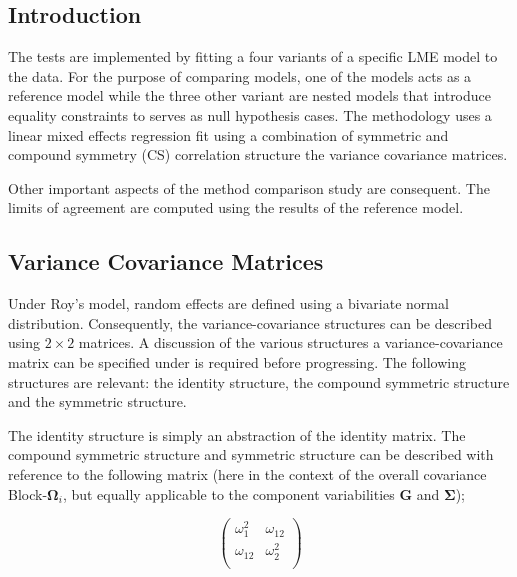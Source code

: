 \documentclass[12pt, a4paper]{report}
\theoremstyle{plain}
\theoremstyle{definition}
\theoremstyle{remark}
\begin{document}
		\subsection{Introduction}
	The tests are implemented by fitting a four variants of a specific LME model to the data. For the purpose of comparing models, one of the models acts as a reference model while the three other variant are nested models that introduce equality constraints to serves as null hypothesis cases. The methodology uses a linear mixed effects regression fit using a combination of symmetric and 
	compound symmetry (CS) correlation structure the variance covariance matrices.
	
	Other important aspects of the method comparison study are consequent. The limits of agreement are computed using the results of the reference model.
	
	
	


	\subsection{Variance Covariance Matrices }
	
	Under Roy's model, random effects are defined using a bivariate normal distribution. Consequently, the variance-covariance structures can be described using $2 \times 2$  matrices. A discussion of the various structures a variance-covariance matrix can be specified under is required before progressing. The following structures are relevant: the identity structure, the compound symmetric structure and the symmetric structure.
	
	The identity structure is simply an abstraction of the identity matrix. The compound symmetric structure and symmetric structure can be described with reference to the following matrix (here in the context of the overall covariance Block-$\boldsymbol{\Omega}_i$, but equally applicable to the component variabilities $\boldsymbol{G}$ and $\boldsymbol{\Sigma}$);
	
	\[\left( \begin{array}{cc}
	\omega^2_1  & \omega_{12} \\
	\omega_{12} & \omega^2_2 \\
	\end{array}\right) \]
	
\end{document}
